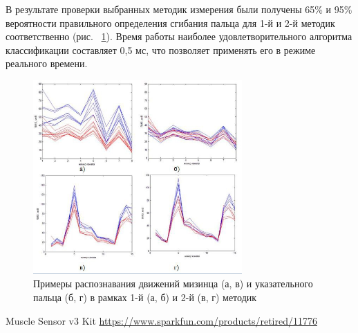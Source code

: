 \documentclass[10pt, a5paper]{article}
\begin{document}
В результате проверки выбранных методик измерения были получены 65\% и 95\% вероятности правильного определения сгибания пальца для 1-й и 2-й методик соответственно (рис. ~\ref{Shamonin3}). Время работы наиболее удовлетворительного алгоритма классификации составляет 0,5 мс, что позволяет применять его в режиме реального времени.
\begin{center}

\begin{figure}[h!]
  \centering
  \includegraphics[width=8cm]{Shamonin3.jpg}
\caption{Примеры распознавания движений мизинца (а, в) и указательного пальца (б, г) в рамках 1-й (а, б) и 2-й (в, г) методик}
  
  \label{Shamonin3}

\end{figure}

\end{center}

\begin{thebibliography}{20}

 Muscle Sensor v3 Kit \url{https://www.sparkfun.com/products/retired/11776}

\end{thebibliography}
\end{document}
